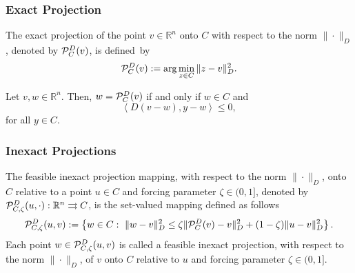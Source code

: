 \documentclass[xcolor=dvipsnames,aspectratio=169,13pt]{beamer} %
\begin{document}
\begin{frame}
  \frametitle{Exact Projection}

  \begin{definition}
    The \textcolor{UFGred}{exact  projection} of the point $v\in \mathbb{R}^{n}$ onto $C$ with respect to the norm $\| \cdot \| _{D}$, denoted by  ${\cal P}_{C}^{D}(v)$, is  defined~by
    \begin{equation*}
      {\cal P}_{C}^{D}(v):=\arg \min _{z\in C}\|z-v\|^2_{D}.
    \end{equation*}
  \end{definition}

  \begin{lemma}
    Let $v, w \in {\mathbb R}^n$.  Then,  $w={\cal P}_{C}^{D}(v)$ if and only if  $w\in C$ and
    \[
      \left\langle D(v-w), y-w\right\rangle \leq  0,
    \]
    for all $y \in C.$
  \end{lemma}

\end{frame}


\begin{frame}
  \frametitle{Inexact Projections}

  \begin{definition}
    The \textcolor{UFGred}{feasible inexact projection mapping}, with respect to the norm $\| \cdot \|_{D}$,   onto $C$  relative to a point  $u \in C$ and forcing parameter $\zeta\in (0, 1]$, denoted by ${\cal P}_{C,\zeta}^{D}(u,  \cdot): {\mathbb R}^n \rightrightarrows C$,  is the set-valued mapping defined as follows
    \begin{equation*}
      {\cal P}_{C,\zeta}^{D}(u, v) := \left\{w\in C:~ \|w-v\|_{D}^2\leq \zeta \| {\cal P}_{C}^{D}(v)-v\|_{D}^2+(1-\zeta)\|u-v\|_{D}^2 \right\}.
    \end{equation*}
    Each point $w\in {\cal P}_{C,\zeta}^{D}(u, v) $ is called a  \textcolor{UFGred}{feasible inexact projection},  with respect to the norm $\| \cdot \|_{D}$,  of $v$ onto $C$ relative to $u$ and forcing parameter $\zeta\in (0, 1]$.
  \end{definition}
\end{frame}
\end{document}
